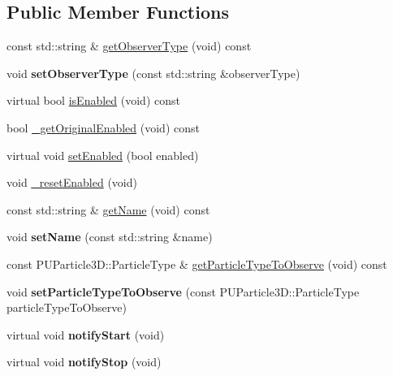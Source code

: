 \subsection*{Public Member Functions}
\begin{DoxyCompactItemize}
\item 
const std\+::string \& \hyperlink{classPUObserver_ada77c2db2e1e1d40237d41fcca481361}{get\+Observer\+Type} (void) const
\item 
\mbox{\label{classPUObserver_a18658c09249599dd36749e09c63e9d1e}} 
void {\bfseries set\+Observer\+Type} (const std\+::string \&observer\+Type)
\item 
virtual bool \hyperlink{classPUObserver_a5f09175e0647409938779df070433660}{is\+Enabled} (void) const
\item 
bool \hyperlink{classPUObserver_a380858d42cdfa11c854f91bfef9d8395}{\+\_\+get\+Original\+Enabled} (void) const
\item 
virtual void \hyperlink{classPUObserver_a5f2b1a071d5579cac1cfbc09b9871853}{set\+Enabled} (bool enabled)
\item 
void \hyperlink{classPUObserver_a344fad62cfdc3d670e52f290a0bf20e8}{\+\_\+reset\+Enabled} (void)
\item 
const std\+::string \& \hyperlink{classPUObserver_a733b40d829f215dcbc8b85852e727d6e}{get\+Name} (void) const
\item 
\mbox{\label{classPUObserver_a19d3639b53a6c9afa304558b51e620ba}} 
void {\bfseries set\+Name} (const std\+::string \&name)
\item 
const P\+U\+Particle3\+D\+::\+Particle\+Type \& \hyperlink{classPUObserver_a22aaee1547d3e035806f3b422efcc261}{get\+Particle\+Type\+To\+Observe} (void) const
\item 
\mbox{\label{classPUObserver_a40341090f2b84d50cd56e7571b639345}} 
void {\bfseries set\+Particle\+Type\+To\+Observe} (const P\+U\+Particle3\+D\+::\+Particle\+Type particle\+Type\+To\+Observe)
\item 
\mbox{\label{classPUObserver_a39e35f02e4aca5d1942cc28f15abf00b}} 
virtual void {\bfseries notify\+Start} (void)
\item 
\mbox{\label{classPUObserver_afb8ce0f27d5640e75fb9c92608160f37}} 
virtual void {\bfseries notify\+Stop} (void)

\end{DoxyCompactItemize}
